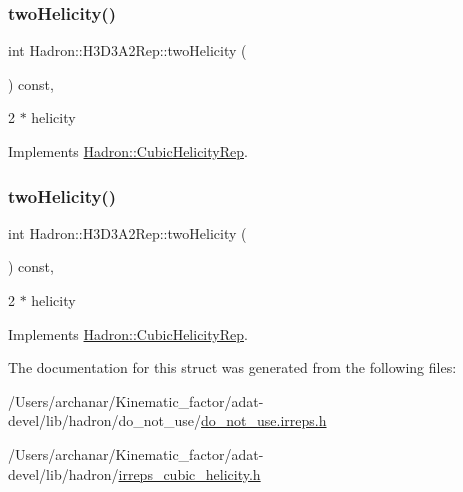 \subsubsection{\texorpdfstring{twoHelicity()}{twoHelicity()}\hspace{0.1cm}{\footnotesize\ttfamily [2/3]}}
{\footnotesize\ttfamily int Hadron\+::\+H3\+D3\+A2\+Rep\+::two\+Helicity (\begin{DoxyParamCaption}{ }\end{DoxyParamCaption}) const\hspace{0.3cm}{\ttfamily [inline]}, {\ttfamily [virtual]}}

2 $\ast$ helicity 

Implements \mbox{\hyperlink{structHadron_1_1CubicHelicityRep_af507aa56fc2747eacc8cb6c96db31ecc}{Hadron\+::\+Cubic\+Helicity\+Rep}}.

\mbox{\label{structHadron_1_1H3D3A2Rep_a9a02375c619de009aa21e02062e23dac}} 
\subsubsection{\texorpdfstring{twoHelicity()}{twoHelicity()}\hspace{0.1cm}{\footnotesize\ttfamily [3/3]}}
{\footnotesize\ttfamily int Hadron\+::\+H3\+D3\+A2\+Rep\+::two\+Helicity (\begin{DoxyParamCaption}{ }\end{DoxyParamCaption}) const\hspace{0.3cm}{\ttfamily [inline]}, {\ttfamily [virtual]}}

2 $\ast$ helicity 

Implements \mbox{\hyperlink{structHadron_1_1CubicHelicityRep_af507aa56fc2747eacc8cb6c96db31ecc}{Hadron\+::\+Cubic\+Helicity\+Rep}}.



The documentation for this struct was generated from the following files\+:\begin{DoxyCompactItemize}
\item 
/\+Users/archanar/\+Kinematic\+\_\+factor/adat-\/devel/lib/hadron/do\+\_\+not\+\_\+use/\mbox{\hyperlink{adat-devel_2lib_2hadron_2do__not__use_2do__not__use_8irreps_8h}{do\+\_\+not\+\_\+use.\+irreps.\+h}}\item 
/\+Users/archanar/\+Kinematic\+\_\+factor/adat-\/devel/lib/hadron/\mbox{\hyperlink{adat-devel_2lib_2hadron_2irreps__cubic__helicity_8h}{irreps\+\_\+cubic\+\_\+helicity.\+h}}\end{DoxyCompactItemize}
